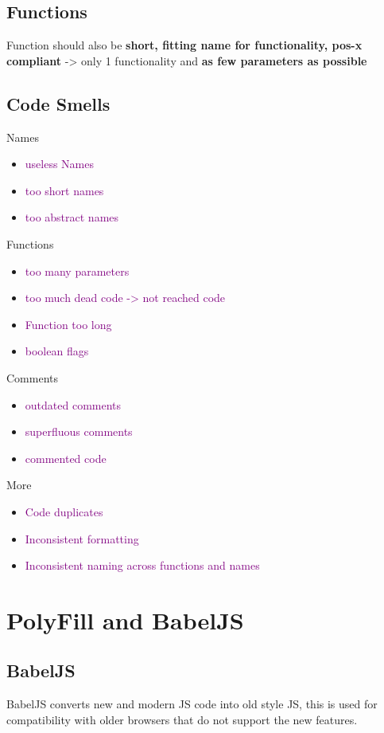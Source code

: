 \documentclass[main.tex,fontsize=6pt,paper=a4,paper=landscape,DIV=calc,]{scrartcl}
\begin{document}
\begin{multicols*}{4}
\subsection{Functions}  
Function should also be \textbf{short, fitting name for functionality, pos-x compliant} -> only 1 functionality and \textbf{as few parameters as possible}

\subsection{Code Smells}  
Names
\begin{itemize}
\item \textcolor{purple}{useless Names}
\item \textcolor{purple}{too short names}
\item \textcolor{purple}{too abstract names}
\end{itemize}
Functions
\begin{itemize}
\item \textcolor{purple}{too many parameters}
\item \textcolor{purple}{too much dead code -> not reached code}
\item \textcolor{purple}{Function too long}
\item \textcolor{purple}{boolean flags}
\end{itemize} 
Comments
\begin{itemize}
\item \textcolor{purple}{outdated comments}
\item \textcolor{purple}{superfluous comments}
\item \textcolor{purple}{commented code}
\end{itemize} 
More
\begin{itemize}
\item \textcolor{purple}{Code duplicates}
\item \textcolor{purple}{Inconsistent formatting}
\item \textcolor{purple}{Inconsistent naming across functions and names}
\end{itemize}


\section{PolyFill and BabelJS}

\subsection{BabelJS}  
BabelJS converts new and modern JS code into old style JS, this is used for compatibility with older browsers that do not support the new features.


\end{multicols*}
\end{document}
